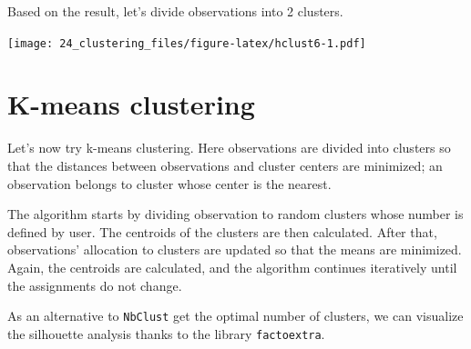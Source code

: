 \documentclass[
]{book}
\newenvironment{Shaded}{\begin{snugshade}}{\end{snugshade}}
\newcommand{\AttributeTok}[1]{\textcolor[rgb]{0.77,0.63,0.00}{#1}}
\newcommand{\CommentTok}[1]{\textcolor[rgb]{0.56,0.35,0.01}{\textit{#1}}}
\newcommand{\ConstantTok}[1]{\textcolor[rgb]{0.00,0.00,0.00}{#1}}
\newcommand{\DecValTok}[1]{\textcolor[rgb]{0.00,0.00,0.81}{#1}}
\newcommand{\FunctionTok}[1]{\textcolor[rgb]{0.00,0.00,0.00}{#1}}
\newcommand{\NormalTok}[1]{#1}
\newcommand{\OtherTok}[1]{\textcolor[rgb]{0.56,0.35,0.01}{#1}}
\newcommand{\SpecialCharTok}[1]{\textcolor[rgb]{0.00,0.00,0.00}{#1}}
\newcommand{\StringTok}[1]{\textcolor[rgb]{0.31,0.60,0.02}{#1}}
\begin{document}
Based on the result, let's divide observations into 2 clusters.

\begin{Shaded}
\end{Shaded}

\texttt{[image: 24\_clustering\_files/figure-latex/hclust6-1.pdf]}

\hypertarget{k-means-clustering}{%
\section{K-means clustering}\label{k-means-clustering}}

Let's now try k-means clustering. Here observations are divided into clusters so
that the distances between observations and cluster centers are
minimized; an observation belongs to cluster whose center is the
nearest.

The algorithm starts by dividing observation to random clusters whose
number is defined by user. The centroids of the clusters are then
calculated. After that, observations' allocation to clusters are
updated so that the means are minimized. Again, the centroids are
calculated, and the algorithm continues iteratively until the assignments
do not change.

As an alternative to \texttt{NbClust} get the optimal number of clusters, we can
visualize the silhouette analysis thanks to the library \texttt{factoextra}.
\end{document}
